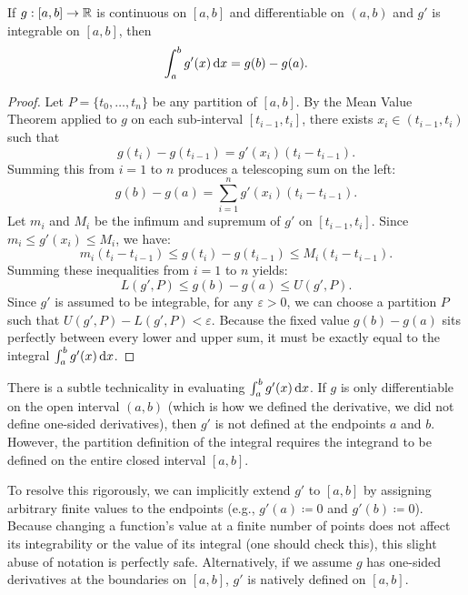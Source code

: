 \documentclass[../analysis1.tex]{subfiles}
\begin{document}
\begin{theorem}
\label{thm:ftc2}
    \begin{shaded*}
        If $g:[a,b]\to\mathbb{R}$ is continuous on $[a,b]$ and differentiable on $(a,b)$ and $g'$ is integrable on $[a,b]$, then
        \[
            \int_a^b g'(x) \d{x} = g(b) - g(a).
        \]
    \end{shaded*}
\end{theorem}

\begin{proof}
    Let $P = \{t_0, \dots, t_n\}$ be any partition of $[a,b]$. By the Mean Value Theorem applied to $g$ on each sub-interval $[t_{i-1}, t_i]$, there exists $x_i \in (t_{i-1}, t_i)$ such that
    \[
        g(t_i) - g(t_{i-1}) = g'(x_i)(t_i - t_{i-1}).
    \]
    Summing this from $i = 1$ to $n$ produces a telescoping sum on the left:
    \[
        g(b) - g(a) = \sum_{i=1}^n g'(x_i) (t_i - t_{i-1}).
    \]
    Let $m_i$ and $M_i$ be the infimum and supremum of $g'$ on $[t_{i-1}, t_i]$. Since $m_i \le g'(x_i) \le M_i$, we have:
    \[
        m_i(t_i - t_{i-1}) \le g(t_i) - g(t_{i-1}) \le M_i(t_i - t_{i-1}).
    \]
    Summing these inequalities from $i = 1$ to $n$ yields:
    \[
        L(g', P) \le g(b) - g(a) \le U(g', P).
    \]
    Since $g'$ is assumed to be integrable, for any $\varepsilon > 0$, we can choose a partition $P$ such that $U(g', P) - L(g', P) < \varepsilon$. Because the fixed value $g(b) - g(a)$ sits perfectly between every lower and upper sum, it must be exactly equal to the integral $\int_a^b g'(x) \d{x}$.
\end{proof}

\begin{remark}
    There is a subtle technicality in evaluating $\int_a^b g'(x) \d{x}$. If $g$ is only differentiable on the open interval $(a,b)$ (which is how we defined the derivative, we did not define one-sided derivatives), then $g'$ is not defined at the endpoints $a$ and $b$. However, the partition definition of the integral requires the integrand to be defined on the entire closed interval $[a,b]$.
    
    To resolve this rigorously, we can implicitly extend $g'$ to $[a,b]$ by assigning arbitrary finite values to the endpoints (e.g., $g'(a) \coloneqq 0$ and $g'(b) \coloneqq 0$). Because changing a function's value at a finite number of points does not affect its integrability or the value of its integral (one should check this), this slight abuse of notation is perfectly safe. Alternatively, if we assume $g$ has one-sided derivatives at the boundaries on $[a,b]$, $g'$ is natively defined on $[a,b]$.
\end{remark}
\end{document}
